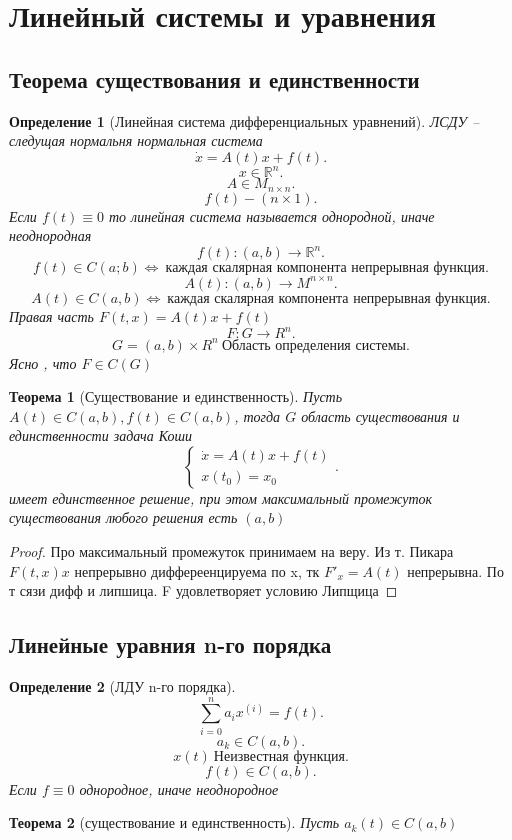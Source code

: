 \documentclass[14pt]{extarticle}
\newtheorem{theorem}{Теорема}
\newtheorem{definition}{Определение}
\begin{document}
 \section{Линейный системы и уравнения}
 \subsection{Теорема существования и единственности}
 \begin{definition}[Линейная система дифференциальных уравнений]
     ЛСДУ -- следущая нормальня нормальная система
     \[
         \dot{x} =A(t)x+f(t)
     .\] 
     \[
     x \in \mathbb{R}^{n}
     .\] 
     \[
     A \in M_{n \times n}
     .\] 
     \[
     f(t)  - (n \times 1)
     .\] 
     Если $f(t) \equiv 0$ то линейная система называется однородной, иначе неоднородная
     \[
     f(t) : (a,b) \to \mathbb{R}^{n}
     .\] 
     \[
         f(t) \in C(a;b) \iff ~\text{каждая скалярная компонента непрерывная функция}
     .\] 
     \[
     A(t) : (a,b) \to M^{n\times n}
     .\] 
     \[
     A(t) \in C(a,b) \iff ~\text{каждая скалярная компонента непрерывная функция}
     .\] 
     Правая часть $F(t,x) = A(t) x + f(t)$
     \[
     F: G \to R^{n}
     .\] 
     \[
         G = (a,b) \times R^{n} ~ \text{Область определения системы}
     .\] 
     Ясно , что $F \in C(G)$
 \end{definition}
 \begin{theorem}[Существование и единственность]
     Пусть $A(t) \in C(a,b), f(t) \in C(a,b)$, тогда  $G$ область существования и единственности задача Коши
     \[
     \begin{cases}
         \dot{x} = A(t) x + f(t)\\
         x(t_0) = x_0
     \end{cases}
     .\] 
     имеет единственное решение, при этом максимальный промежуток существования любого решения есть $(a,b)$
 \end{theorem}
 \begin{proof}
     Про максимальный промежуток принимаем на веру. Из т. Пикара $F(t,x)x$ непрерывно диффереенцируема по x, тк  $F'_{x} = A(t)$ непрерывна. По т сязи дифф и липшица. F удовлетворяет условию Липщица
 \end{proof}
 \subsection{Линейные уравния n-го порядка}
 \begin{definition}[ЛДУ n-го порядка]
     \[
         \sum_{i = 0}^{n} a_{i}x^{(i)} = f(t)
     .\] 
     \[
     a_{k} \in C(a,b)
     .\] 
     \[
         x(t) ~\text{Неизвестная функция}
     .\] 
     \[
     f(t) \in C(a,b)
     .\] 
     Если $f \equiv 0 $ однородное, иначе неоднородное
 \end{definition}
 \begin{theorem}[существование и единственность]
     Пусть $a_{k}(t) \in C(a,b)$
 \end{theorem}
\end{document}
